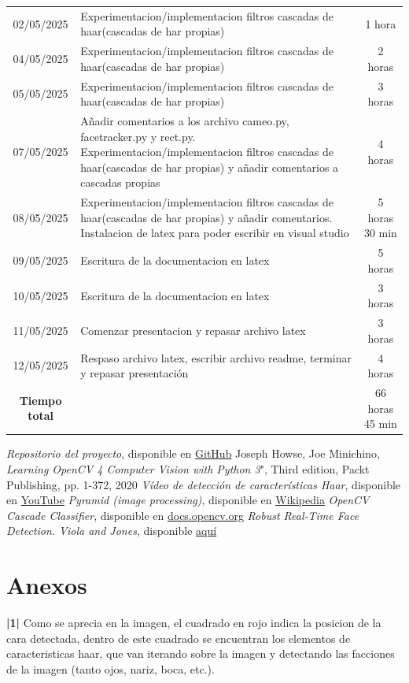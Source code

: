 \documentclass[a4paper]{article}
\begin{document}
\begin{table}[H]
\begin{tabular}{|c|p{10cm}|c|}
02/05/2025 & Experimentacion/implementacion filtros cascadas de haar(cascadas de har propias) & 1 hora \\
04/05/2025 & Experimentacion/implementacion filtros cascadas de haar(cascadas de har propias) & 2 horas \\
05/05/2025 & Experimentacion/implementacion filtros cascadas de haar(cascadas de har propias) & 3 horas \\
07/05/2025 & Añadir comentarios a los archivo cameo.py, facetracker.py y rect.py. Experimentacion/implementacion filtros cascadas de haar(cascadas de har propias) y añadir comentarios a cascadas propias & 4 horas \\
08/05/2025 & Experimentacion/implementacion filtros cascadas de haar(cascadas de har propias) y añadir comentarios. Instalacion de latex para poder escribir en visual studio & 5 horas 30 min \\
09/05/2025 & Escritura de la documentacion en latex & 5 horas \\
10/05/2025 & Escritura de la documentacion en latex & 3 horas \\
11/05/2025 & Comenzar presentacion y repasar archivo latex & 3 horas \\
12/05/2025 & Respaso archivo latex, escribir archivo readme, terminar y repasar presentación & 4 horas \\
\textbf{Tiempo total} & & 66 horas 45 min\\
\hline
\end{tabular}
\end{table}

\newpage
\begin{thebibliography}{99}
 \textit{Repositorio del proyecto}, disponible en \href{https://github.com/PacktPublishing/Learning-OpenCV-4-Computer-Vision-with-Python-Third-Edition}{GitHub}
 Joseph Howse, Joe Minichino, \textit{Learning OpenCV 4 Computer Vision with Python 3}", Third edition, Packt Publishing, pp. 1-372, 2020
 \textit{Vídeo de detección de características Haar}, disponible en \href{https://youtu.be/hPCTwxF0qf4}{YouTube}
 \textit{Pyramid (image processing)}, disponible en \href{https://en.wikipedia.org/wiki/Pyramid_(image_processing)}{Wikipedia}
 \textit{OpenCV Cascade Classifier}, disponible en \href{https://docs.opencv.org/3.4/db/d28/tutorial_cascade_classifier.html}{docs.opencv.org}
 \textit{Robust Real-Time Face Detection. Viola and Jones}, disponible \href{https://www.face-rec.org/algorithms/Boosting-Ensemble/16981346.pdf}{aquí}
\end{thebibliography}

\newpage
\section*{Anexos}
\textbf{|1|} Como se aprecia en la imagen, el cuadrado en rojo indica la posicion de la cara detectada, dentro de este cuadrado se encuentran los elementos de caracteristicas haar, que van iterando sobre la imagen y detectando las facciones de la imagen (tanto ojos, nariz, boca, etc.).
\end{document}
